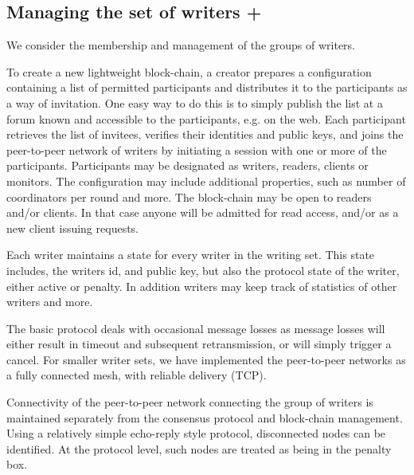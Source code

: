 \documentclass[10pt]{article}
\begin{document}
\subsection{Managing the set of writers +}

We consider the membership and management of the groups of writers. 

To create a new lightweight block-chain, a creator prepares a configuration containing a list of permitted participants and distributes it to the participants as a way of invitation. One easy way to do this is to simply publish the list at a forum known and accessible to the participants, e.g. on the web. Each participant retrieves the list of invitees, verifies their identities and public keys, and joins the peer-to-peer network of writers by initiating a session with one or more of the participants. Participants may be designated as writers, readers, clients or monitors. The configuration may include additional properties, such as number of coordinators per round and more. The block-chain may be open to readers and/or clients. In that case anyone will be admitted for read access, and/or as a new client issuing requests.

Each writer maintains a state for every writer in the writing set. This state includes, the writers id, and public key, but also the protocol state of the writer, either active or penalty. In addition writers may keep track of statistics of other writers and more.

The basic protocol deals with occasional message losses as message losses will either result in timeout and subsequent retransmission, or will simply trigger a cancel. For smaller writer sets, we have implemented the peer-to-peer networks as a fully connected mesh, with reliable delivery (TCP). 

Connectivity of the peer-to-peer network connecting the group of writers is maintained separately from the consensus protocol and block-chain management. Using a relatively simple echo-reply style protocol, disconnected nodes can be %
identified. At the protocol level, such nodes are treated as being in the penalty box.


\end{document}
